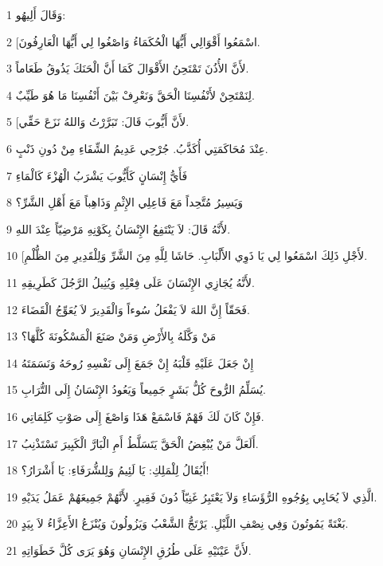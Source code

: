 \par 1 وَقَالَ أَلِيهُو:
\par 2 [اسْمَعُوا أَقْوَالِي أَيُّهَا الْحُكَمَاءُ وَاصْغُوا لِي أَيُّهَا الْعَارِفُونَ.
\par 3 لأَنَّ الأُذُنَ تَمْتَحِنُ الأَقْوَالَ كَمَا أَنَّ الْحَنَكَ يَذُوقُ طَعَاماً.
\par 4 لِنَمْتَحِنْ لأَنْفُسِنَا الْحَقَّ وَنَعْرِفْ بَيْنَ أَنْفُسِنَا مَا هُوَ طَيِّبٌ.
\par 5 [لأَنَّ أَيُّوبَ قَالَ: تَبَرَّرْتُ وَاللهُ نَزَعَ حَقِّي.
\par 6 عِنْدَ مُحَاكَمَتِي أُكَذَّبُ. جُرْحِي عَدِيمُ الشِّفَاءِ مِنْ دُونِ ذَنْبٍ.
\par 7 فَأَيُّ إِنْسَانٍ كَأَيُّوبَ يَشْرَبُ الْهُزْءَ كَالْمَاءِ
\par 8 وَيَسِيرُ مُتَّحِداً مَعَ فَاعِلِي الإِثْمِ وَذَاهِباً مَعَ أَهْلِ الشَّرِّ؟
\par 9 لأَنَّهُ قَالَ: لاَ يَنْتَفِعُ الإِنْسَانُ بِكَوْنِهِ مَرْضِيّاً عِنْدَ اللهِ.
\par 10 [لأَجْلِ ذَلِكَ اسْمَعُوا لِي يَا ذَوِي الأَلْبَابِ. حَاشَا لِلَّهِ مِنَ الشَّرِّ وَلِلْقَدِيرِ مِنَ الظُّلْمِ.
\par 11 لأَنَّهُ يُجَازِي الإِنْسَانَ عَلَى فِعْلِهِ وَيُنِيلُ الرَّجُلَ كَطَرِيقِهِ.
\par 12 فَحَقّاً إِنَّ اللهَ لاَ يَفْعَلُ سُوءاً وَالْقَدِيرَ لاَ يُعَوِّجُ الْقَضَاءَ.
\par 13 مَنْ وَكَّلَهُ بِالأَرْضِ وَمَنْ صَنَعَ الْمَسْكُونَةَ كُلَّهَا؟
\par 14 إِنْ جَعَلَ عَلَيْهِ قَلْبَهُ إِنْ جَمَعَ إِلَى نَفْسِهِ رُوحَهُ وَنَسَمَتَهُ
\par 15 يُسَلِّمُ الرُّوحَ كُلُّ بَشَرٍ جَمِيعاً وَيَعُودُ الإِنْسَانُ إِلَى التُّرَابِ.
\par 16 فَإِنْ كَانَ لَكَ فَهْمٌ فَاسْمَعْ هَذَا وَاصْغَ إِلَى صَوْتِ كَلِمَاتِي.
\par 17 أَلَعَلَّ مَنْ يُبْغِضُ الْحَقَّ يَتَسَلَّطُ أَمِ الْبَارَّ الْكَبِيرَ تَسْتَذْنِبُ.
\par 18 أَيُقَالُ لِلْمَلِكِ: يَا لَئِيمُ وَلِلشُّرَفَاءِ: يَا أَشْرَارُ؟!
\par 19 الَّذِي لاَ يُحَابِي بِوُجُوهِ الرُّؤَسَاءِ وَلاَ يَعْتَبِرُ غَنِيّاً دُونَ فَقِيرٍ. لأَنَّهُمْ جَمِيعَهُمْ عَمَلُ يَدَيْهِ.
\par 20 بَغْتَةً يَمُوتُونَ وَفِي نِصْفِ اللَّيْلِ. يَرْتَجُّ الشَّعْبُ وَيَزُولُونَ وَيُنْزَعُ الأَعِزَّاءُ لاَ بِيَدٍ.
\par 21 لأَنَّ عَيْنَيْهِ عَلَى طُرُقِ الإِنْسَانِ وَهُوَ يَرَى كُلَّ خَطَوَاتِهِ.

